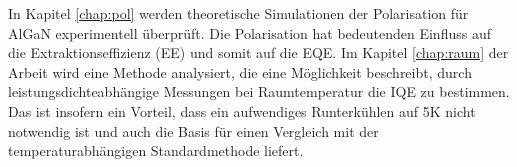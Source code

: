 In Kapitel \ref{chap:pol} werden theoretische Simulationen der Polarisation für AlGaN experimentell überprüft. Die Polarisation hat bedeutenden Einfluss auf die Extraktionseffizienz (EE) und somit auf die EQE.
Im Kapitel \ref{chap:raum} der Arbeit wird eine Methode analysiert, die eine Möglichkeit beschreibt, durch leistungsdichteabhängige Messungen bei Raumtemperatur die IQE zu bestimmen. Das ist insofern ein Vorteil, dass ein aufwendiges Runterkühlen auf 5K nicht notwendig ist und auch die Basis für einen Vergleich mit der temperaturabhängigen Standardmethode liefert.













